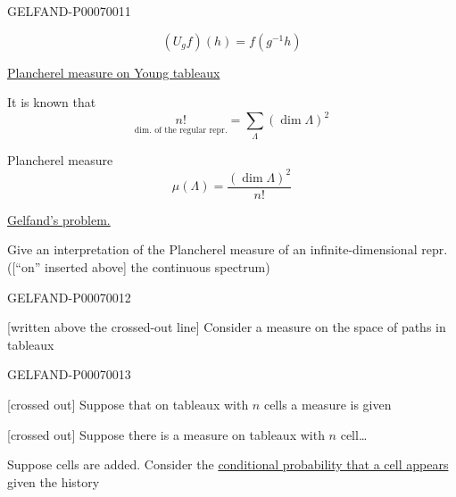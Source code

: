 \begin{GelfandAdjacentEvidence}{GELFAND-P000700}{11}

\[
(U_g f)(h)=f(g^{-1}h)
\]

\underline{Plancherel measure on Young tableaux}

It is known that
\[
\underset{\text{dim. of the regular repr.}}{n!}=\sum_\Lambda(\dim\Lambda)^2
\]

Plancherel measure
\[
\mu(\Lambda)=\frac{(\dim\Lambda)^2}{n!}
\]

\underline{Gelfand’s problem.}

Give an interpretation of the Plancherel measure of an infinite-dimensional repr. ([“on” inserted above] the continuous spectrum)
\end{GelfandAdjacentEvidence}
\begin{GelfandAdjacentEvidence}{GELFAND-P000700}{12}


[written above the crossed-out line] Consider a measure on the space of paths in tableaux
\end{GelfandAdjacentEvidence}
\begin{GelfandAdjacentEvidence}{GELFAND-P000700}{13}


[crossed out] Suppose that on tableaux with \(n\) cells a measure is given

[crossed out] Suppose there is a measure on tableaux with \(n\) cell…
\end{GelfandAdjacentEvidence}


Suppose cells are added. Consider the \underline{conditional probability that a cell appears} given the history


